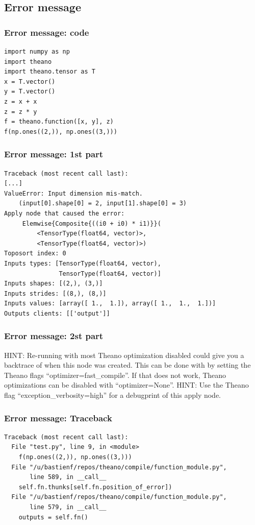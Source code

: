 \documentclass[utf8x,xcolor=pdftex,dvipsnames,table]{beamer}
\begin{document}
\subsection{Error message}
\begin{frame}[fragile]
  \frametitle{Error message: code}
\begin{lstlisting}
import numpy as np
import theano
import theano.tensor as T
x = T.vector()
y = T.vector()
z = x + x
z = z * y
f = theano.function([x, y], z)
f(np.ones((2,)), np.ones((3,)))
\end{lstlisting}
\end{frame}

\begin{frame}[fragile]
  \frametitle{Error message: 1st part}

\begin{lstlisting}
Traceback (most recent call last):
[...]
ValueError: Input dimension mis-match.
    (input[0].shape[0] = 2, input[1].shape[0] = 3)
Apply node that caused the error:
     Elemwise{Composite{((i0 + i0) * i1)}}(
         <TensorType(float64, vector)>,
         <TensorType(float64, vector)>)
Toposort index: 0
Inputs types: [TensorType(float64, vector),
               TensorType(float64, vector)]
Inputs shapes: [(2,), (3,)]
Inputs strides: [(8,), (8,)]
Inputs values: [array([ 1.,  1.]), array([ 1.,  1.,  1.])]
Outputs clients: [['output']]
\end{lstlisting}
\end{frame}

\begin{frame}[fragile]
  \frametitle{Error message: 2st part}
HINT: Re-running with most Theano optimization
disabled could give you a backtrace of when this
node was created. This can be done with by setting
the Theano flags ``optimizer=fast\_compile''. If that does not
work, Theano optimizations can be disabled with
``optimizer=None''.\newline
HINT: Use the Theano flag ``exception\_verbosity=high''
for a debugprint of this apply node.
\end{frame}


\begin{frame}[fragile]
  \frametitle{Error message: Traceback}

\begin{lstlisting}
Traceback (most recent call last):
  File "test.py", line 9, in <module>
    f(np.ones((2,)), np.ones((3,)))
  File "/u/bastienf/repos/theano/compile/function_module.py",
       line 589, in __call__
    self.fn.thunks[self.fn.position_of_error])
  File "/u/bastienf/repos/theano/compile/function_module.py",
       line 579, in __call__
    outputs = self.fn()
\end{lstlisting}
\end{frame}
\end{document}
